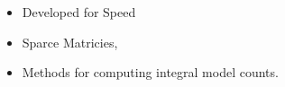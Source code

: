 \begin{itemize}
  \item Developed for Speed
  \item Sparce Matricies, 
  \item Methods for computing integral model counts.
\end{itemize}
